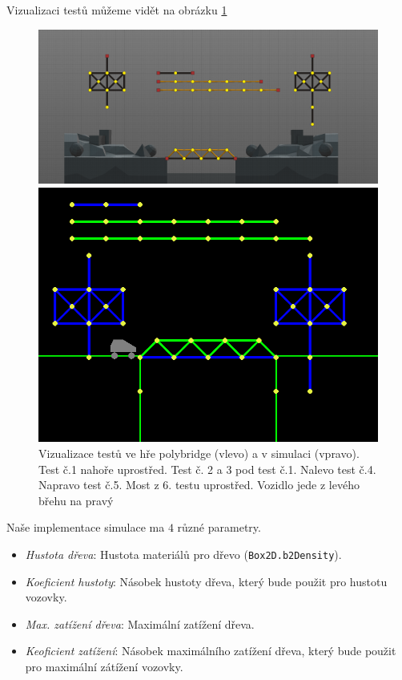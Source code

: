 Vizualizaci testů můžeme vidět na obrázku \ref{impl-fig:1}

\begin{figure}[ht]
    \centering
    \begin{minipage}{0.49\textwidth}
        \centering
        \includegraphics[width=\linewidth]{img/poly_tests.png}
    \end{minipage}\hfill
    \begin{minipage}{0.49\textwidth}
        \centering
        \includegraphics[width=\linewidth]{img/sim_tests.png}
    \end{minipage}
    \caption{Vizualizace testů ve hře polybridge (vlevo) a v simulaci (vpravo). Test č.1 nahoře uprostřed. Test č. 2 a 3 pod test č.1. Nalevo test č.4. Napravo test č.5. Most z 6. testu uprostřed. Vozidlo jede z levého břehu na pravý}
    \label{impl-fig:1}
\end{figure}

Naše implementace simulace ma $4$ různé parametry.
\begin{itemize}
    \item \emph{Hustota dřeva}: Hustota materiálů pro dřevo (\texttt{Box2D.b2Density}).
    \item \emph{Koeficient hustoty}: Násobek hustoty dřeva, který bude použit pro hustotu vozovky.
    \item \emph{Max. zatížení dřeva}: Maximální zatížení dřeva.
    \item \emph{Keoficient zatížení}: Násobek maximálního zatížení dřeva, který bude použit pro maximální zátížení vozovky.
\end{itemize}

